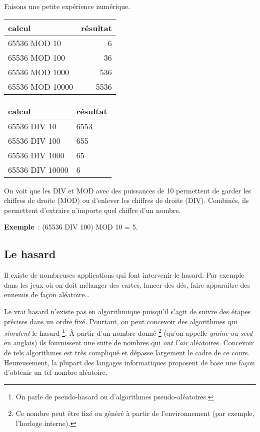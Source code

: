 			Faisons une petite expérience numérique.
			\begin{center}
			\begin{tabular}{|l|r|}\hline
				calcul & résultat \\\hline
				\hline
				65536 MOD 10 & 6 \\  
				65536 MOD 100 & 36 \\  
				65536 MOD 1000 & 536 \\  
				65536 MOD 10000 & 5536 \\ 
				\hline 
			\end{tabular}
			\qquad
			\begin{tabular}{|l|l|}\hline
				calcul & résultat \\\hline
				\hline
				65536 DIV 10 & 6553 \\  
				65536 DIV 100 & 655 \\  
				65536 DIV 1000 & 65 \\  
				65536 DIV 10000 & 6 \\ 
				\hline 
			\end{tabular}
			\end{center}
		
			On voit que les DIV et MOD avec des puissances de 10
			permettent de garder les chiffres de droite (MOD)
			ou d’enlever les chiffres de droite (DIV).
			Combinés, ils permettent d’extraire n’importe quel
			chiffre d’un nombre.
			
			\textbf{Exemple}~: (65536 DIV 100) MOD 10 = 5.

		\subsection{Le hasard}
			
			Il existe de nombreuses applications 
			qui font intervenir le hasard.
			Par exemple dans les jeux où on doit mélanger des cartes,
			lancer des dés, 
			faire apparaitre des ennemis de façon aléatoire\dots
			
			Le vrai hasard n’existe pas en algorithmique
			puisqu’il s’agit de suivre des étapes précises
			dans un ordre fixé.
			Pourtant, on peut concevoir des algorithmes
			qui \emph{simulent} le hasard%
			\footnote{%
				On parle de pseudo-hasard
				ou d’algorithmes pseudo-aléatoires.
			}.
			À partir d’un nombre donné%
			\footnote{%
				Ce nombre peut être fixé ou généré à partir
				de l’environnement 
				(par exemple, l’horloge interne).
			}
			(qu’on appelle \emph{graine} ou \emph{seed} en anglais)
			ils fournissent une suite de nombres qui \emph{ont l’air}
			aléatoires.			
			Concevoir de tels algorithmes est très compliqué
			et dépasse largement le cadre de ce cours.
			Heureusement, la plupart des langages informatiques proposent de base
			une façon d'obtenir un tel nombre aléatoire.


